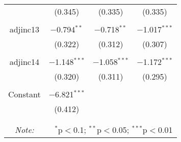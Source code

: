 \documentclass{article}
\begin{document}
\begin{longtable}{cccc}
  & (0.345) & (0.335) & (0.335) \\ 
  & & & \\ 
 adjinc13 & $-$0.794$^{**}$ & $-$0.718$^{**}$ & $-$1.017$^{***}$ \\ 
  & (0.322) & (0.312) & (0.307) \\ 
  & & & \\ 
 adjinc14 & $-$1.148$^{***}$ & $-$1.058$^{***}$ & $-$1.172$^{***}$ \\ 
  & (0.320) & (0.311) & (0.295) \\ 
  & & & \\ 
 Constant & $-$6.821$^{***}$ &  &  \\ 
  & (0.412) &  &  \\ 
  & & & \\ 
\hline \\[-1.8ex] 
\textit{Note:}  & \multicolumn{3}{r}{$^{*}$p$<$0.1; $^{**}$p$<$0.05; $^{***}$p$<$0.01} \\ 
\end{longtable}

\clearpage

\printbibliography
\end{document}
